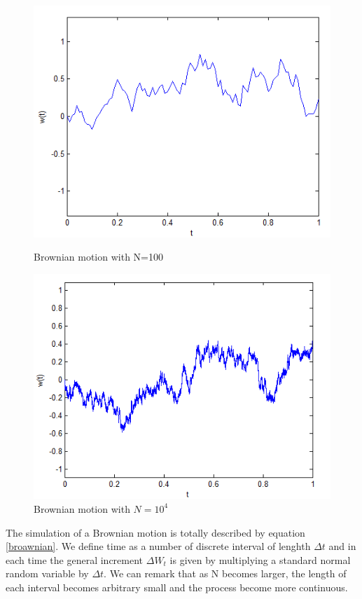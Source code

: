 \documentclass[12pt]{report}
\begin{document}
\begin{figure}[!htb]
  \includegraphics[width=\linewidth]{brownian.png}
\caption{Brownian motion with N=100}
\endminipage\hfill
{}
  \includegraphics[width=\linewidth]{brownianN.png}
  \caption{Brownian motion with $N=10^4$}
\endminipage\hfill
\end{figure}

The simulation of a Brownian motion is totally described by equation  \eqref{broawnian}. We define time as a number of discrete interval of lenghth $\Delta t$ and in each time the general increment $\Delta W_t$ is given by multiplying  a standard normal random variable by $\Delta t$. We can remark that as N becomes larger, the length of each interval becomes arbitrary small and the process become more continuous. \\
\end{document}
